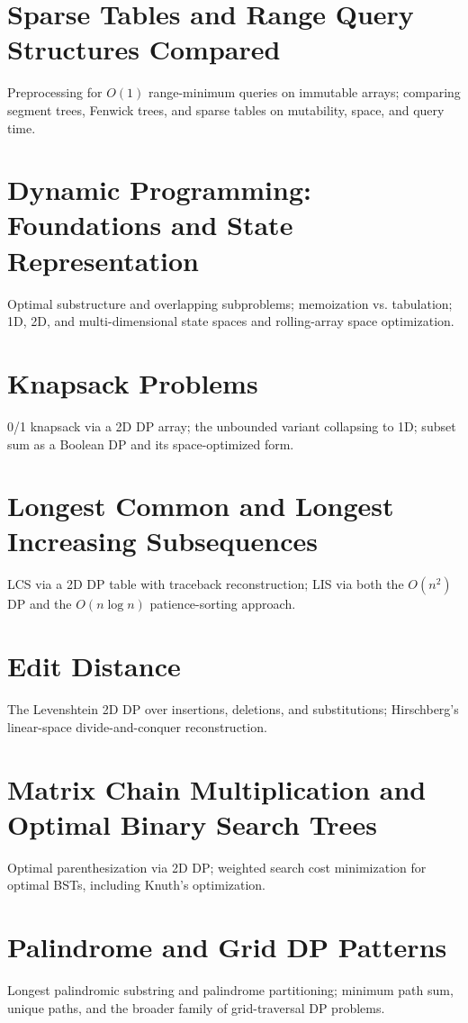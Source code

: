 \chapter{Sparse Tables and Range Query Structures Compared}
Preprocessing for $O(1)$ range-minimum queries on immutable arrays; comparing segment trees, Fenwick trees, and sparse tables on mutability, space, and query time.

\chapter{Dynamic Programming: Foundations and State Representation}
Optimal substructure and overlapping subproblems; memoization vs. tabulation; 1D, 2D, and multi-dimensional state spaces and rolling-array space optimization.

\chapter{Knapsack Problems}
0/1 knapsack via a 2D DP array; the unbounded variant collapsing to 1D; subset sum as a Boolean DP and its space-optimized form.

\chapter{Longest Common and Longest Increasing Subsequences}
LCS via a 2D DP table with traceback reconstruction; LIS via both the $O(n^2)$ DP and the $O(n \log n)$ patience-sorting approach.

\chapter{Edit Distance}
The Levenshtein 2D DP over insertions, deletions, and substitutions; Hirschberg's linear-space divide-and-conquer reconstruction.

\chapter{Matrix Chain Multiplication and Optimal Binary Search Trees}
Optimal parenthesization via 2D DP; weighted search cost minimization for optimal BSTs, including Knuth's optimization.

\chapter{Palindrome and Grid DP Patterns}
Longest palindromic substring and palindrome partitioning; minimum path sum, unique paths, and the broader family of grid-traversal DP problems.

